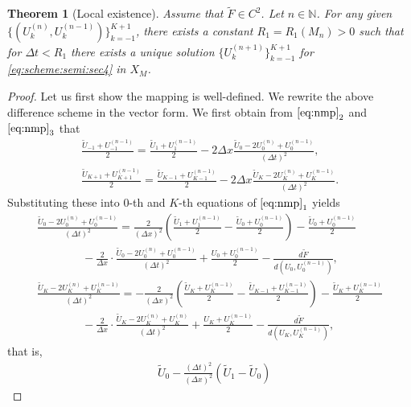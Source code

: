 \documentclass[dvipdfmx-if-dvi,autodetect-engine,ja=standard]{amsart}
\numberwithin{equation}{section} %
\newtheorem{theorem}[definition]{Theorem}
\begin{document}
\begin{theorem}[Local existence]\label{thm:exist:sol}
Assume that 
$\tilde{F} \in C^2$.
Let
$n \in \mathbb{N}$.
For any given
$\{(U_k^{(n)}, U_k^{(n-1)}) \}_{k=-1}^{K+1}$,
there exists a constant
$R_1 = R_1(M_n) > 0$
such that for
$\Delta t < R_1$
there exists a unique solution 
$\{U_k^{(n+1)}\}_{k=-1}^{K+1}$
for \eqref{eq:scheme:semi:sec4}
in $X_M$. 
\end{theorem}
\begin{proof}
Let us first show the mapping is well-defined.   
We rewrite the above difference scheme in
the vector form. 
We first obtain from
$\eqref{eq:nmp}_2$ and
$\eqref{eq:nmp}_3$ that 
\begin{gather*}
\frac{\widetilde{U}_{-1}+U_{-1}^{(n-1)}}{2}
= \frac{\widetilde{U}_1+U_1^{(n-1)}}{2}
- 2 \Delta x \frac{\widetilde{U}_0 - 2 U_0^{(n)} +  U_0^{(n-1)}}{(\Delta t)^2}, \\
\frac{\widetilde{U}_{K+1}+U_{K+1}^{(n-1)}}{2}
= \frac{\widetilde{U}_{K-1}+U_{K-1}^{(n-1)}}{2}
- 2 \Delta x \frac{\widetilde{U}_K - 2 U_K^{(n)} +  U_K^{(n-1)}}{(\Delta t)^2}. 
\end{gather*}
Substituting these into $0$-th and $K$-th equations of $\eqref{eq:nmp}_1$ yields 
\begin{gather*}
\frac{\widetilde{U}_0 - 2 U_0^{(n)} +  U_0^{(n-1)}}{(\Delta t)^2}  
    = \frac{2}{(\Delta x)^2}
    \left(
        \frac{\widetilde{U}_1+U_1^{(n-1)}}{2}
        -  \frac{\widetilde{U}_0+U_0^{(n-1)}}{2} \right)
    - \frac{\widetilde{U}_0+U_0^{(n-1)}}{2} \\
    \qquad \qquad - \frac{2}{\Delta x} \cdot \frac{\widetilde{U}_0 - 2 U_0^{(n)} +  U_0^{(n-1)}}{(\Delta t)^2}
    + \frac{U_0+U_0^{(n-1)}}{2}
    -\frac{d \tilde{F}}{d(U_0, U_0^{(n-1)})},\\
\frac{\widetilde{U}_K - 2 U_K^{(n)} +  U_K^{(n-1)}}{(\Delta t)^2}  
    = - \frac{2}{(\Delta x)^2}
    \left(
        \frac{\widetilde{U}_K+U_K^{(n-1)}}{2}
        -  \frac{\widetilde{U}_{K-1}+U_{K-1}^{(n-1)}}{2} \right)
    - \frac{\widetilde{U}_K+U_K^{(n-1)}}{2} \\
    \qquad \qquad
    - \frac{2}{\Delta x} \cdot \frac{\widetilde{U}_K - 2 U_K^{(n)} +  U_K^{(n)}}{(\Delta t)^2}
    + \frac{U_K+U_K^{(n-1)}}{2}
    -\frac{d \tilde{F}}{d(U_K, U_K^{(n-1)})},
\end{gather*}
that is,
\begin{align*}
    &\widetilde{U}_0 - \frac{(\Delta t)^2}{(\Delta x)^2} (\widetilde{U}_1 - \widetilde{U}_0)

\end{align*}
\end{proof}
\end{document}
